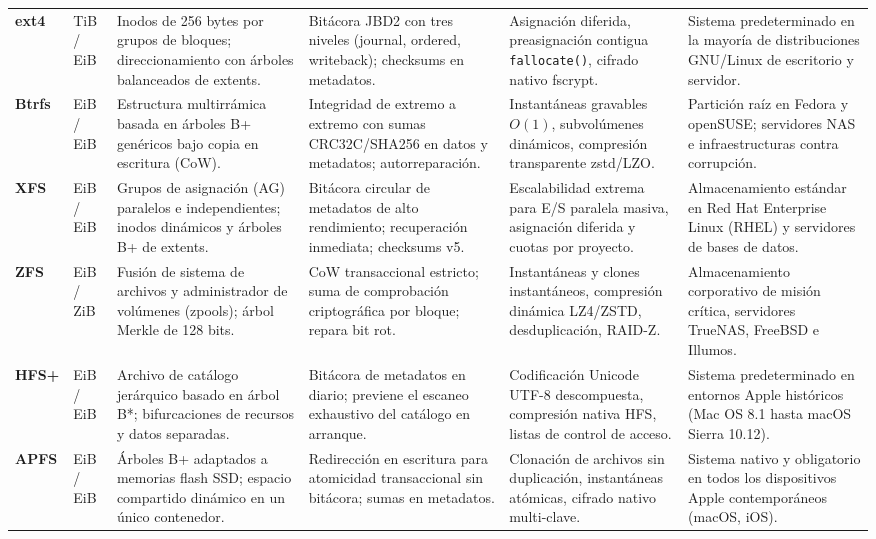 \documentclass[12pt]{article}
\begin{document}
\begin{table}[!htbp]
\begin{tabularx}{\textwidth}{>{\centering\arraybackslash}m{1.3cm} >{\centering\arraybackslash}m{1.9cm} X X X X}
\addlinespace
\textbf{ext4} & 16 TiB / \newline 1 EiB & Inodos de 256 bytes por grupos de bloques; direccionamiento con árboles balanceados de extents. & Bitácora JBD2 con tres niveles (journal, ordered, writeback); checksums en metadatos. & Asignación diferida, preasignación contigua \texttt{fallocate()}, cifrado nativo fscrypt. & Sistema predeterminado en la mayoría de distribuciones GNU/Linux de escritorio y servidor. \\
\addlinespace
\textbf{Btrfs} & 16 EiB / \newline 16 EiB & Estructura multirrámica basada en árboles B+ genéricos bajo copia en escritura (CoW). & Integridad de extremo a extremo con sumas CRC32C/SHA256 en datos y metadatos; autorreparación. & Instantáneas gravables $O(1)$, subvolúmenes dinámicos, compresión transparente zstd/LZO. & Partición raíz en Fedora y openSUSE; servidores NAS e infraestructuras contra corrupción. \\
\addlinespace
\textbf{XFS} & 8 EiB / \newline 8 EiB & Grupos de asignación (AG) paralelos e independientes; inodos dinámicos y árboles B+ de extents. & Bitácora circular de metadatos de alto rendimiento; recuperación inmediata; checksums v5. & Escalabilidad extrema para E/S paralela masiva, asignación diferida y cuotas por proyecto. & Almacenamiento estándar en Red Hat Enterprise Linux (RHEL) y servidores de bases de datos. \\
\addlinespace
\textbf{ZFS} & 16 EiB / \newline 256 ZiB & Fusión de sistema de archivos y administrador de volúmenes (zpools); árbol Merkle de 128 bits. & CoW transaccional estricto; suma de comprobación criptográfica por bloque; repara bit rot. & Instantáneas y clones instantáneos, compresión dinámica LZ4/ZSTD, desduplicación, RAID-Z. & Almacenamiento corporativo de misión crítica, servidores TrueNAS, FreeBSD e Illumos. \\
\addlinespace
\textbf{HFS+} & 8 EiB / \newline 8 EiB & Archivo de catálogo jerárquico basado en árbol B*; bifurcaciones de recursos y datos separadas. & Bitácora de metadatos en diario; previene el escaneo exhaustivo del catálogo en arranque. & Codificación Unicode UTF-8 descompuesta, compresión nativa HFS, listas de control de acceso. & Sistema predeterminado en entornos Apple históricos (Mac OS 8.1 hasta macOS Sierra 10.12). \\
\addlinespace
\textbf{APFS} & 8 EiB / \newline 8 EiB & Árboles B+ adaptados a memorias flash SSD; espacio compartido dinámico en un único contenedor. & Redirección en escritura para atomicidad transaccional sin bitácora; sumas en metadatos. & Clonación de archivos sin duplicación, instantáneas atómicas, cifrado nativo multi-clave. & Sistema nativo y obligatorio en todos los dispositivos Apple contemporáneos (macOS, iOS). \\

\end{tabularx}
\end{table}
\end{document}
